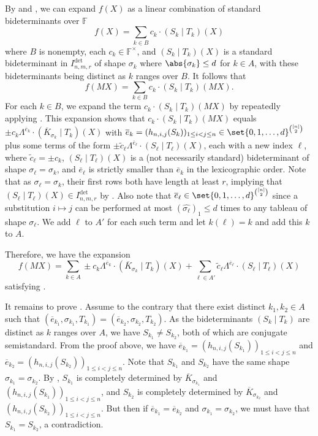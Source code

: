 \documentclass[10pt,a4paper]{amsart}
\newcommand*\F{\mathbb{F}}
\begin{document}
\begin{pf}
By  and , we can expand $f(X)$ as a linear combination of standard bideterminants over $\F$
\[
    f(X)=\sum_{k \in B} c_k \cdot (S_k\mid T_k)(X)
\]
where $B$ is nonempty, each $c_k \in \F^\times$, and $(S_k \mid T_k)(X)$ is a standard bideterminant in $I^{\det}_{n,m,r}$ of shape $\sigma_k$ where $\abs{\sigma_k} \leq d$ for $k \in A$, with these bideterminants being distinct as $k$ ranges over $B$.
It follows that 
\[
    f(MX)=\sum_{k\in B} c_k \cdot (S_k\mid T_k)(MX).
\]
For each $k\in B$, we expand the term $c_k \cdot (S_k\mid T_k)(MX)$ by repeatedly applying .
This expansion shows that $c_k \cdot (S_k\mid T_k)(MX)$ equals $\pm c_k \Lambda^{\overline{e}_k}\cdot (\overline{K}_{\sigma_k}\mid T_k)(X)$ with $\overline{e}_k=(h_{n,i,j}(S_k))_{1\leq i<j\leq n} \in \set{0, 1, \dots, d}^{\binom{[n]}{2}}$ plus some terms of the form $\pm \widetilde{c}_{\ell}\Lambda^{\overline{e}_\ell}\cdot (S_\ell\mid T_\ell)(X)$, each with a new index $\ell$,
where $\widetilde{c}_{\ell}=\pm c_k$, $(S_\ell\mid T_\ell)(X)$ is a (not necessarily standard) bideterminant of shape $\sigma_\ell=\sigma_k$, and $\overline{e}_\ell$ is strictly smaller than $\overline{e}_k$ in the lexicographic order.
Note that as $\sigma_\ell=\sigma_k$, their first rows both have length at least $r$, implying that $(S_\ell\mid T_\ell)(X)\in I^{\det}_{n,m,r}$ by .
Also note that $\overline{e}_\ell \in \set{0, 1, \dots, d}^{\binom{[n]}{2}}$ since a substitution $i\mapsto j$ can be performed at most $(\widehat{\sigma_\ell})_1\leq d$ times to any tableau of shape $\sigma_\ell$.
We add $\ell$ to $A'$ for each such term and let $k(\ell) = k$ and add this $k$ to $A$.

Therefore, we have the expansion
\[
    f(MX) = \sum_{k \in A} \pm{c}_{k} \Lambda^{\overline{e}_k}\cdot (\overline{K}_{\sigma_k}\mid T_k)(X) + \sum_{\ell\in A'} \widetilde{c}_{\ell} \Lambda^{\overline{e}_\ell}\cdot (S_\ell\mid T_\ell)(X)
\]
satisfying .

It remains to prove .
Assume to the contrary that there exist distinct $k_1,k_2\in A$ such that $(\overline{e}_{k_1},\sigma_{k_1},T_{k_1})=(\overline{e}_{k_2},\sigma_{k_2},T_{k_2})$.
As the bideterminants $(S_k\mid T_k)$ are distinct as $k$ ranges over $A$, we have $S_{k_1}\neq S_{k_2}$, both of which are conjugate semistandard.
From the proof above, we have $\overline{e}_{k_1}=(h_{n,i,j}(S_{k_1}))_{1\leq i < j \leq n}$
and $\overline{e}_{k_2}=(h_{n,i,j}(S_{k_2}))_{1\leq i<j\leq n}$.
Note that $S_{k_1}$ and $S_{k_2}$ have the same shape $\sigma_{k_1}=\sigma_{k_2}$.
By , $S_{k_1}$ is completely determined by $\overline{K}_{\sigma_{k_1}}$ and $(h_{n,i,j}(S_{k_1}))_{1\leq i<j \leq n}$, and $S_{k_2}$ is completely determined by $\overline{K}_{\sigma_{k_2}}$ and $(h_{n,i,j}(S_{k_2}))_{1\leq i < j \leq n }$.
But then if $\overline{e}_{k_1} = \overline{e}_{k_2}$ and $\sigma_{k_1} = \sigma_{k_2}$, we must have that $S_{k_1} = S_{k_2}$, a contradiction.
\end{pf}
\end{document}
